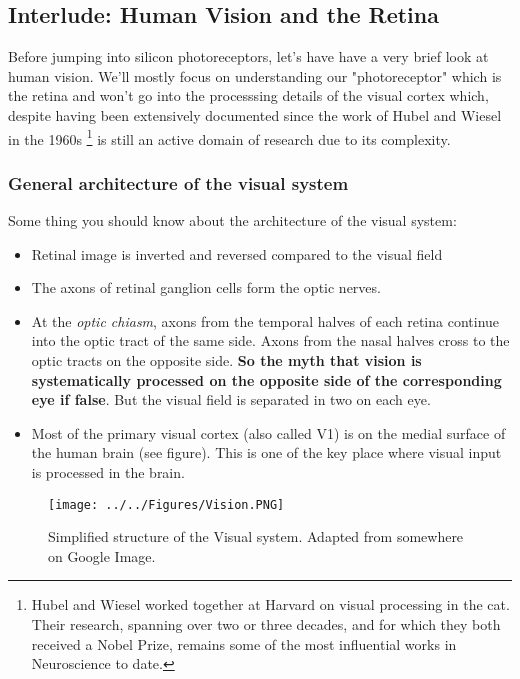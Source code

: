 \subsection{Interlude: Human Vision and the Retina}

Before jumping into silicon photoreceptors, let's have have a very brief look at human vision. We'll mostly focus on understanding our "photoreceptor" which is the retina and won't go into the processsing details of the visual cortex which, despite having been extensively documented since the work of Hubel and Wiesel in the 1960s \footnote{Hubel and Wiesel worked together at Harvard on visual processing in the cat. Their research, spanning over two or three decades, and for which they both received a Nobel Prize, remains some of the most influential works in Neuroscience to date.} is still an active domain of research due to its complexity. 

\subsubsection{General architecture of the visual system}

Some thing you should know about the architecture of the visual system: 
\begin{itemize}
    \item Retinal image is inverted and reversed compared to the visual field
    \item The axons of retinal ganglion cells form the optic nerves.
    \item At the \textit{optic chiasm}, axons from the temporal halves of each retina continue into the optic tract of the same side. Axons from the nasal halves cross to the optic tracts on the opposite side. \textbf{So the myth that vision is systematically processed on the opposite side of the corresponding eye if false}. But the visual field is separated in two on each eye.  
    \item Most of the primary visual cortex (also called V1) is on the medial surface of the human brain (see figure). This is one of the key place where visual input is processed in the brain.
\end{itemize}

\begin{figure}[H]
    \centering
    \texttt{[image: ../../Figures/Vision.PNG]}
    \caption{Simplified structure of the Visual system. Adapted from somewhere on Google Image.}
    \label{Vision}
\end{figure}


